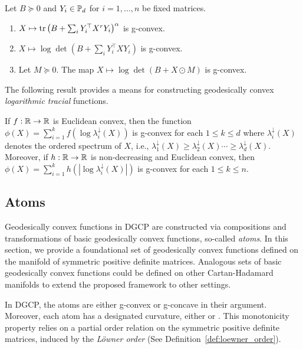 \documentclass[twoside,11pt]{article}
\begin{document}
\begin{example}
Let $B \succeq 0$ and $Y_i \in \mathbb{P}_d$ for $i = 1, \ldots, n$ be fixed matrices. 
    \begin{enumerate}
    \item  $X \mapsto \text{tr}\left(B +  \sum_i Y_i^\top X^r Y_i\right)^\alpha$ is g-convex.
    \item $X \mapsto \log \det\left( B + \sum_i Y_i^\top X Y_i\right)$ is g-convex.
    \item Let $M \succeq 0$. The map
    $X \mapsto \log \det \left(B +  X \odot M\right)$
    is g-convex.
\end{enumerate}

\end{example}



The following result provides a means for constructing geodesically convex  \textit{logarithmic tracial} functions.

\begin{theorem}\label{theorem:sra_logtrace}
    If $f: \mathbb{R} \to \mathbb{R}$ is Euclidean convex, then the function $\phi(X) = \sum_{i=1}^k f \left(\log \lambda^\downarrow_i(X)\right)$ is g-convex for each $1 \leq k \leq d$ where $\lambda_i^\downarrow(X)$ denotes the ordered spectrum of $X$, i.e., $\lambda_1^\downarrow(X) \geq \lambda_2^\downarrow(X) \cdots \geq \lambda_d^\downarrow(X)$. Moreover, if $h: \mathbb{R} \to \mathbb{R}$ is non-decreasing and Euclidean convex, then $\phi(X) = \sum_{i=1}^k h(|\log \lambda_i^\downarrow(X)|)$ is g-convex for each $1 \leq k \leq n$.
\end{theorem}





\subsection{Atoms}\label{sec:atoms}
Geodesically convex functions in DGCP are constructed via compositions and transformations of basic geodesically convex functions, so-called \textit{atoms}. In this section, we provide a foundational set of geodesically convex functions defined on the manifold of symmetric positive definite matrices. Analogous sets of basic geodesically convex functions could be defined on other Cartan-Hadamard manifolds to extend the proposed framework to other settings.

In DGCP, the atoms are either g-convex or g-concave in their argument. Moreover, each atom has a designated curvature, either  or . This monotonicity property relies on a partial order relation on the symmetric positive definite matrices, induced by the \emph{Löwner order} (See Definition~\ref{def:loewner_order}).
\end{document}
